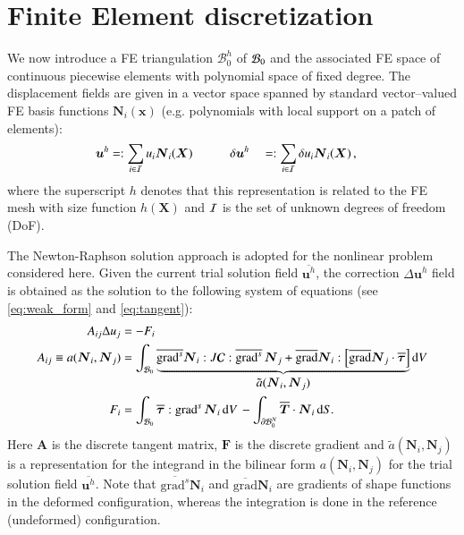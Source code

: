 \documentclass[preprint,12pt,times]{elsarticle}
\def\gz  #1{           \mbox{$\boldsymbol{#1}$}}
\def\grad {\mbox{grad}}
\def\d {\mbox{d}}
\def\mcl  #1{               {\cal #1}}
\begin{document}
\section{Finite Element discretization}
\label{sec:fe}

We now introduce a FE triangulation $\mathcal{B}^h_0$ of $\mcl B_0$ and
the associated FE space of continuous piecewise elements with polynomial space of fixed degree. %
The displacement fields are given in
a vector space spanned by standard vector--valued FE basis functions $\gz N_i(\gz x)$ (e.g. polynomials with local support on a patch of elements):
\begin{alignat}{2}
       \gz u^h &=:  \sum_{i \in \mcl I} u_i \gz N_i (\gz X) \quad \quad \quad
\delta \gz u^h &&=: \sum_{i \in \mcl I} \delta u_i \gz N_i (\gz X) \,,
\end{alignat}
where the superscript $h$ denotes that this representation is related to the FE mesh with size function $h(\gz X)$ and $\mcl I$ is the set of unknown degrees of freedom (DoF).

The Newton-Raphson solution approach is adopted for the nonlinear problem considered here.
Given the current trial solution field $\overline{\gz u^h}$, the correction $\Delta \gz u^h$ field is obtained as the solution to the following system of equations (see \eqref{eq:weak_form} and \eqref{eq:tangent}):
\begin{align}
  A_{ij} \Delta u_j &= - F_i  \label{eq:linear_system} \\
  A_{ij} \equiv a(\gz N_i, \gz N_j) &=
  \int_{\mcl B_0}
  \underbrace{
  \overline{\grad^s} \gz N_i : J \boldsymbol{\mathcal{C}} : \overline{\grad^s} \, \gz N_j
  +
  \overline{\grad}\gz N_i :
  \left[
  \overline{\grad} \gz N_j \cdot
  \overline{\gz \tau}
  \right]
  }_{\displaystyle \tilde{a}(\gz N_i, \gz N_j)}
  \d V
  \label{eq:algebraic_tangent}
  \\
  F_i &=
  \int_{\mcl B_0} \overline{\gz \tau} : \grad^{s} \, \gz N_i \, \d V \,
  -
  \int_{\partial \mcl B_0^N} \overline{\gz T} \cdot \gz N_i \, \d S.
\end{align}
Here $\gz A$ is the discrete tangent matrix, $\gz F$ is the discrete gradient
and $\tilde{a}(\gz N_i, \gz N_j)$ is a representation for the integrand in the bilinear form $a(\gz N_i, \gz N_j)$ for the trial solution field $\overline{\gz u^h}$.
Note that $\overline{\grad^s} \gz N_i$ and $\overline{\grad} \gz N_i$ are gradients of shape functions in the deformed configuration, whereas the integration is done in the reference (undeformed) configuration.
\end{document}

